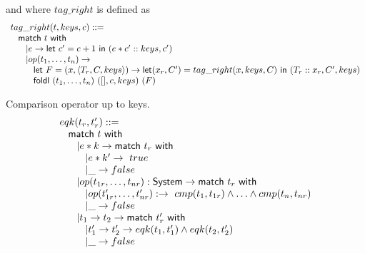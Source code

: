 \documentclass{article}[12pt,a4paper]
\theoremstyle{definition}
\begin{document}
and where $tag\_right$ is defined as
\[
  \begin{array}{l}
    tag\_right(t, keys, c) ::=\\
    \hspace{2ex}\mathsf{match}~t~\mathsf{with}\\
    \hspace{4ex}| e \rightarrow \mathsf{let}~c'=c+1~\mathsf{in}~
    (e*c'::keys,c')\\
    \hspace{4ex}| op(t_1,\ldots,t_n) \rightarrow \\
    \hspace{6ex} \mathsf{let}~F = (x,\langle T_r,C,keys\rangle)\rightarrow \mathsf{let}(x_r,C')=tag\_right(x, keys, C)~\mathsf{in}~(T_r::x_r,C', keys)\\
    \hspace{6ex} \mathsf{foldl}~(t_1,\ldots,t_n)~([],c,keys)~(F)
  \end{array}
\]

Comparison operator up to keys.
\[
  \begin{array}{l}
    eqk(t_r,t'_r) ::=\\
    \hspace{2ex}\mathsf{match}~t~\mathsf{with}\\
    \hspace{4ex}| e*k \rightarrow \mathsf{match}~t_r~\mathsf{with}\\
    \hspace{6ex}| e*k'\rightarrow~true\\
    \hspace{6ex}| \_ \rightarrow false\\
    \hspace{4ex}| op(t_{1r},\ldots,t_{nr}): \mathsf{System} \rightarrow \mathsf{match}~t_r~\mathsf{with}\\
    \hspace{6ex}| op(t'_{1r},\ldots,t'_{nr}): \rightarrow~cmp(t_1,t_{1r}) \wedge\ldots\wedge cmp(t_n,t_{nr})\\
    \hspace{6ex}| \_ \rightarrow false\\
    \hspace{4ex}| t_1 \rightarrow t_2 \rightarrow \mathsf{match}~t'_r~\mathsf{with}\\
    \hspace{6ex}| t'_1 \rightarrow t'_2 \rightarrow eqk(t_1,t_1')\wedge eqk(t_2,t_2')\\
    \hspace{6ex}| \_ \rightarrow false

  \end{array}
\]
\end{document}
